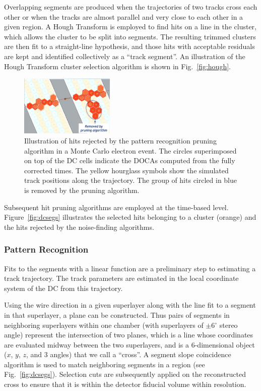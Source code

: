 Overlapping segments are produced when the trajectories of two tracks cross each other or when the tracks are
almost parallel and very close to each other in a given region. A Hough Transform is employed to find hits on a line
in the cluster, which allows the cluster to be split into segments.  The resulting trimmed clusters are then fit to a
straight-line hypothesis, and those hits with acceptable residuals are kept and identified collectively as a
``track segment''. An illustration of the Hough Transform cluster selection algorithm is shown in Fig.~\ref{fig:hough}.

\begin{figure}[t]
\centering
\includegraphics[width=0.4\textwidth]{pics/dcPattern2.png}
\caption{Illustration of hits rejected by the pattern recognition pruning algorithm in a Monte Carlo electron
  event. The circles superimposed on top of the DC cells indicate the DOCAs computed from the fully corrected
  times. The yellow hourglass symbols show the simulated track positions along the trajectory. The group of hits
  circled in blue is removed by the pruning algorithm.}
\label{fig:strings}
\end{figure}

Subsequent hit pruning algorithms are employed at the time-based level. Figure~\ref{fig:dcsegs} illustrates the
selected hits belonging to a cluster (orange) and the hits rejected by the noise-finding algorithms.

\subsubsection{Pattern Recognition}

Fits to the segments with a linear function are a preliminary step to estimating a track trajectory. The track
parameters are estimated in the local coordinate system of the DC from this trajectory.

Using the wire direction in a given superlayer along with the line fit to a segment in that superlayer, a plane can
be constructed. Thus pairs of segments in neighboring superlayers within one chamber (with superlayers of
$\pm$6$^\circ$ stereo angle) represent the intersection of two planes, which is a line whose coordinates are
evaluated midway between the two superlayers, and is a 6-dimensional object ($x$, $y$, $z$, and 3 angles) that
we call a ``cross''. A segment slope coincidence algorithm is used to match neighboring segments in a region (see
Fig.~\ref{fig:dcsegs}).  Selection cuts are subsequently applied on the reconstructed cross to ensure that it is
within the detector fiducial volume within resolution.


